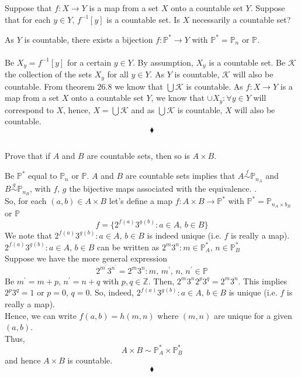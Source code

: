 \subsection{}
\begin{tcolorbox}
Suppose that $f: X\rightarrow Y$ is a map from a set $X$ onto a countable set $Y$. Suppose that for each $y \in  Y,\,  f^{-1}[y]$ is a countable set. Is $X$ necessarily a countable set? 

\end{tcolorbox}
$$ $$
As $Y$ is countable, there exists a bijection $f:\mathbb{P}^* \rightarrow Y $ with $\mathbb{P}^* = \mathbb{P}_n$ or $\mathbb{P}$.\\\\
Be $X_y= f^{-1}[y]$ for a certain $y\in Y$. By assumption, $X_y$ is a countable set. Be $\mathscr{K}$ the collection of the sets $X_y$ for all $y\in Y$. As $Y$ is countable, $\mathscr{K}$ will also be countable. From theorem $\mathbf{26.8}$ we know that $\bigcup\mathscr{K}$ is countable. As $f: X\rightarrow Y$ is a map from a set $X$ onto a countable set $Y$, we know that $\cup X_y:\forall y\in Y$ will correspond to $X$, hence, $X=\bigcup\mathscr{K}$ and as $\bigcup\mathscr{K}$ is countable, $X$ will also be countable.
$$\blacklozenge$$


\subsection{}
\begin{tcolorbox}
Prove that if $A$ and $B$ are countable sets, then so is $A \times B$.  
\end{tcolorbox}
$$ $$
Be $\mathbb{P}^*$ equal to  $ \mathbb{P}_{n}$ or $\mathbb{P}$.
$A$ and $B$ are countable sets implies that $A\overset{f}{\sim} \mathbb{P}_{n_A}$ and  $B\overset{g}{\sim}\mathbb{P}_{n_B}$, with $f,\, g$ the  bijective maps associated with the equivalence. .\\
So, for each $(a,b)\in  A\times B$ let's define a map $f:A\times B\rightarrow \mathbb{P}^*$ with $\mathbb{P}^*= \mathbb{P}_{n_A\times b_B}$ or $\mathbb{P}$
$$ f=\{2^{f^{}(a)} 3^{g^{}(b)}:a\in A,\, b\in B\}$$
We note that $2^{f^{}(a)} 3^{g^{}(b)}:a\in A,\, b\in B$ is indeed unique (i.e. $f$ is really a map).\\
$2^{f^{}(a)} 3^{g^{}(b)}:a\in A,\, b\in B$ can be written as $2^m 3^n:m\in \mathbb{P}_A^*,\,n\in \mathbb{P}_B^* $\\
Suppose we have the more general expression 
$$2^{m^{'}} 3^{n^{'}}=2^{m} 3^{n}:m, \,m^{'},\, n,\,n^{'}\in \mathbb{P} $$
Be $m^{'}=m+p,\, n^{'}=n+q $ with $ p,q\in \mathbb{Z}$. Then,
$2^{m^{}} 3^{n^{}}2^{p} 3^{q}=2^{m} 3^{n}$. This implies $2^{p} 3^{q}=1$ or $p=0,\, q=0$. So, indeed, $2^{f^{}(a)} 3^{g^{}(b)}:a\in A,\, b\in B$ is unique (i.e. $f$ is really a map).\\
Hence, we can write $f(a,b)= h(m,n)$ where $(m,n)$ are unique for a given $(a,b)$. \\
Thus, $$A\times B \sim \mathbb{P}_A^*\times \mathbb{P}_B^*$$
and hence $A\times B$ is countable.
$$\blacklozenge$$

